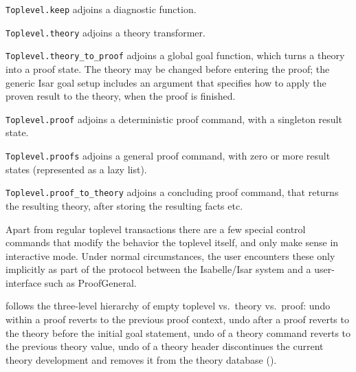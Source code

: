 \begin{isabellebody}
\begin{isamarkuptext}
\begin{description}
  \item \verb|Toplevel.keep| adjoins a diagnostic function.

  \item \verb|Toplevel.theory| adjoins a theory transformer.

  \item \verb|Toplevel.theory_to_proof| adjoins a global goal function,
  which turns a theory into a proof state.  The theory may be changed
  before entering the proof; the generic Isar goal setup includes an
  argument that specifies how to apply the proven result to the
  theory, when the proof is finished.

  \item \verb|Toplevel.proof| adjoins a deterministic proof command,
  with a singleton result state.

  \item \verb|Toplevel.proofs| adjoins a general proof command, with
  zero or more result states (represented as a lazy list).

  \item \verb|Toplevel.proof_to_theory| adjoins a concluding proof
  command, that returns the resulting theory, after storing the
  resulting facts etc.

  \end{description}%
\end{isamarkuptext}%
\isamarkuptrue%
%
\endisatagmlref
{\isafoldmlref}%
%
\isadelimmlref
%
\endisadelimmlref
%
\isamarkuptrue%
%
\begin{isamarkuptext}%
Apart from regular toplevel transactions there are a few
  special control commands that modify the behavior the toplevel
  itself, and only make sense in interactive mode.  Under normal
  circumstances, the user encounters these only implicitly as part of
  the protocol between the Isabelle/Isar system and a user-interface
  such as ProofGeneral.

  \begin{description}

  \item {} follows the three-level hierarchy of empty
  toplevel vs.\ theory vs.\ proof: undo within a proof reverts to the
  previous proof context, undo after a proof reverts to the theory
  before the initial goal statement, undo of a theory command reverts
  to the previous theory value, undo of a theory header discontinues
  the current theory development and removes it from the theory
  database ().


\end{description}
\end{isamarkuptext}
\end{isabellebody}
